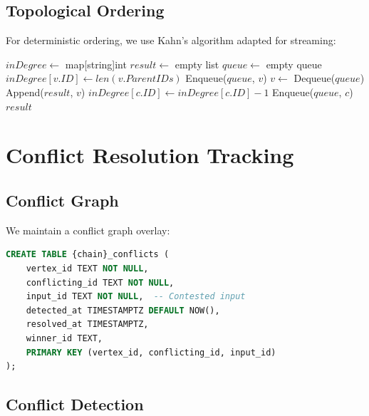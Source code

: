 \documentclass[11pt,twocolumn]{article}
\begin{document}
\subsection{Topological Ordering}

For deterministic ordering, we use Kahn's algorithm adapted for streaming:

\begin{algorithm}
\caption{Streaming Topological Sort}
\begin{algorithmic}[1]
    \State $inDegree \gets$ map[string]int
    \State $result \gets$ empty list
    \State $queue \gets$ empty queue
        \State $inDegree[v.ID] \gets len(v.ParentIDs)$
            \State Enqueue($queue$, $v$)
        \EndIf
    \EndFor
        \State $v \gets$ Dequeue($queue$)
        \State Append($result$, $v$)
            \State $inDegree[c.ID] \gets inDegree[c.ID] - 1$
                \State Enqueue($queue$, $c$)
            \EndIf
        \EndFor
    \EndWhile
    \State \Return $result$
\EndProcedure
\end{algorithmic}
\end{algorithm}

\section{Conflict Resolution Tracking}

\subsection{Conflict Graph}

We maintain a conflict graph overlay:

\begin{lstlisting}[language=SQL,caption={Conflict tracking schema}]
CREATE TABLE {chain}_conflicts (
    vertex_id TEXT NOT NULL,
    conflicting_id TEXT NOT NULL,
    input_id TEXT NOT NULL,  -- Contested input
    detected_at TIMESTAMPTZ DEFAULT NOW(),
    resolved_at TIMESTAMPTZ,
    winner_id TEXT,
    PRIMARY KEY (vertex_id, conflicting_id, input_id)
);
\end{lstlisting}

\subsection{Conflict Detection}
\end{document}
